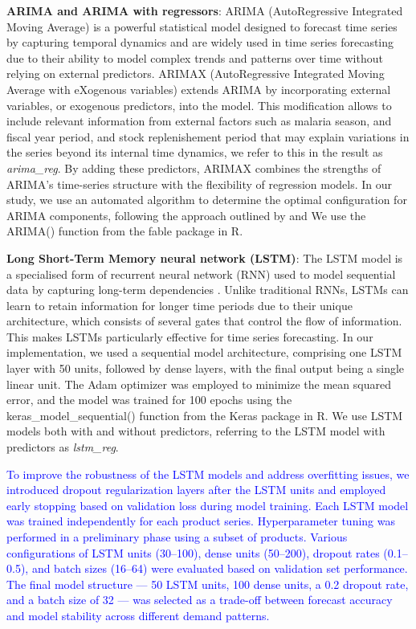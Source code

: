 \documentclass[
  authoryear,
  preprint,
  3p]{elsarticle}
\begin{document}
\textbf{ARIMA and ARIMA with regressors}: ARIMA (AutoRegressive
Integrated Moving Average) is a powerful statistical model designed to
forecast time series by capturing temporal dynamics and are widely used
in time series forecasting due to their ability to model complex trends
and patterns over time without relying on external predictors. ARIMAX
(AutoRegressive Integrated Moving Average with eXogenous variables)
extends ARIMA by incorporating external variables, or exogenous
predictors, into the model. This modification allows to include relevant
information from external factors such as malaria season, and fiscal
year period, and stock replenishement period that may explain variations
in the series beyond its internal time dynamics, we refer to this in the
result as \emph{arima\_reg}. By adding these predictors, ARIMAX combines
the strengths of ARIMA's time-series structure with the flexibility of
regression models. In our study, we use an automated algorithm to
determine the optimal configuration for ARIMA components, following the
approach outlined by \citet{hyndman2021forecasting} and We use the
ARIMA() function from the fable package in R.

\textbf{Long Short-Term Memory neural network (LSTM)}: The LSTM model is
a specialised form of recurrent neural network (RNN) used to model
sequential data by capturing long-term dependencies
\citep{graves2012long}. Unlike traditional RNNs, LSTMs can learn to
retain information for longer time periods due to their unique
architecture, which consists of several gates that control the flow of
information. This makes LSTMs particularly effective for time series
forecasting. In our implementation, we used a sequential model
architecture, comprising one LSTM layer with 50 units, followed by dense
layers, with the final output being a single linear unit. The Adam
optimizer was employed to minimize the mean squared error, and the model
was trained for 100 epochs using the keras\_model\_sequential() function
from the Keras package in R. We use LSTM models both with and without
predictors, referring to the LSTM model with predictors as
\emph{lstm\_reg}.

\textcolor{blue}{To improve the robustness of the LSTM models and address overfitting issues, we introduced dropout regularization layers after the LSTM units and employed early stopping based on validation loss during model training. Each LSTM model was trained independently for each product series. Hyperparameter tuning was performed in a preliminary phase using a subset of products. Various configurations of LSTM units (30–100), dense units (50–200), dropout rates (0.1–0.5), and batch sizes (16–64) were evaluated based on validation set performance. The final model structure — 50 LSTM units, 100 dense units, a 0.2 dropout rate, and a batch size of 32 — was selected as a trade-off between forecast accuracy and model stability across different demand patterns.}
\end{document}

